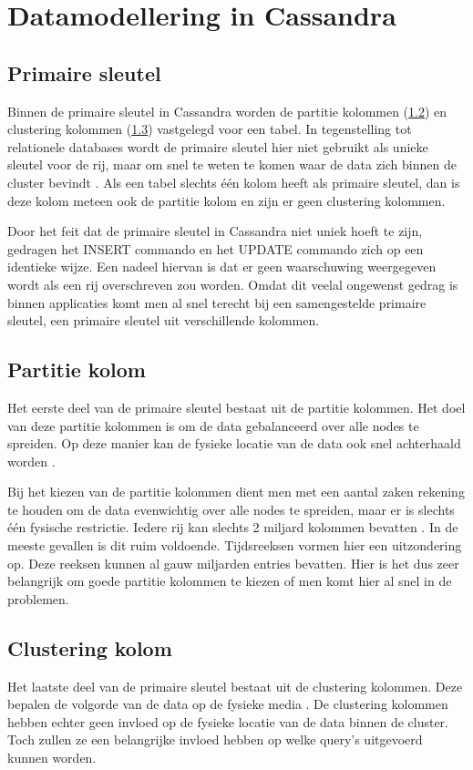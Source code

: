 \chapter{Datamodellering in Cassandra}
\label{ch:cassandra_modelling}
\section{Primaire sleutel}
Binnen de primaire sleutel in Cassandra worden de partitie kolommen (\ref{partition_key}) en clustering kolommen (\ref{clustering_key}) vastgelegd voor een tabel.
In tegenstelling tot relationele databases wordt de primaire sleutel hier niet gebruikt als unieke sleutel voor de rij, maar om snel te weten te komen waar de data zich binnen de cluster bevindt \citep{kan2014cassandra}.
Als een tabel slechts één kolom heeft als primaire sleutel, dan is deze kolom meteen ook de partitie kolom en zijn er geen clustering kolommen.

Door het feit dat de primaire sleutel in Cassandra niet uniek hoeft te zijn, gedragen het INSERT commando en het UPDATE commando zich op een identieke wijze.
Een nadeel hiervan is dat er geen waarschuwing weergegeven wordt als een rij overschreven zou worden.
Omdat dit veelal ongewenst gedrag is binnen applicaties komt men al snel terecht bij een samengestelde primaire sleutel, een primaire sleutel uit verschillende kolommen.

\section{Partitie kolom}
\label{partition_key}
Het eerste deel van de primaire sleutel bestaat uit de partitie kolommen.
Het doel van deze partitie kolommen is om de data gebalanceerd over alle nodes te spreiden.
Op deze manier kan de fysieke locatie van de data ook snel achterhaald worden \citep{kan2014cassandra}.

Bij het kiezen van de partitie kolommen dient men met een aantal zaken rekening te houden om de data evenwichtig over alle nodes te spreiden, maar er is slechts één fysische restrictie.
Iedere rij kan slechts 2 miljard kolommen bevatten \citep{McFadin2013Timeseries}.
In de meeste gevallen is dit ruim voldoende.
Tijdsreeksen vormen hier een uitzondering op.
Deze reeksen kunnen al gauw miljarden entries bevatten.
Hier is het dus zeer belangrijk om  goede partitie kolommen te kiezen of men komt hier al snel in de problemen.

\section{Clustering kolom}
\label{clustering_key}
Het laatste deel van de primaire sleutel bestaat uit de clustering kolommen.
Deze bepalen de volgorde van de data op de fysieke media \citep{strickland2014availability}.
De clustering kolommen hebben echter geen invloed op de fysieke locatie van de data binnen de cluster.
Toch zullen ze een belangrijke invloed hebben op welke query's uitgevoerd kunnen worden.

